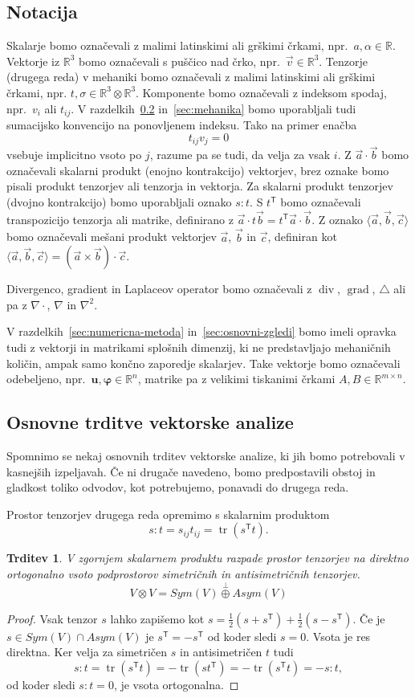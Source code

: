 \documentclass[12pt,a4paper,twoside]{article}
\theoremstyle{definition} %
\theoremstyle{plain} %
\newtheorem{trditev}[definicija]{Trditev}
\numberwithin{equation}{section}
\newcommand{\R}{\mathbb R}
\newcommand{\T}{\mathsf{T}}
\newcommand{\lap}{\triangle}
\renewcommand{\div}{\operatorname{div}}
\newcommand{\grad}{\operatorname{grad}}
\renewcommand{\b}{\boldsymbol}
\renewcommand{\phi}{\varphi}
\newcommand{\vv}{\vec{v}}
\newcommand{\va}{\vec{a}}
\newcommand{\vc}{\vec{c}}
\newcommand{\vb}{\vec{b}}
\DeclareMathOperator{\tr}{tr}
\begin{document}
\subsection{Notacija}
Skalarje bomo označevali z malimi latinskimi ali grškimi črkami, npr.\ $a, \alpha
\in \R$. Vektorje iz $\R^3$ bomo označevali s puščico nad črko, npr.\ $\vv \in
\R^3$. Tenzorje (drugega reda) v mehaniki bomo označevali z malimi latinskimi ali grškimi
črkami, npr. $t, \sigma \in \R^3\otimes\R^3$.
Komponente bomo označevali z indeksom spodaj, npr.\ $v_i$ ali $t_{ij}$.
V razdelkih~\ref{sec:uvod-tenz} in~\ref{sec:mehanika} bomo
uporabljali tudi sumacijsko konvencijo na ponovljenem indeksu. Tako na primer enačba
\[
  t_{ij}v_j = 0
\]
vsebuje implicitno vsoto po $j$, razume pa se tudi, da velja za vsak $i$.
Z $\va\cdot\vb$ bomo označevali skalarni produkt (enojno kontrakcijo) vektorjev, brez oznake bomo
pisali produkt tenzorjev ali tenzorja in vektorja. Za skalarni produkt tenzorjev (dvojno
kontrakcijo) bomo uporabljali oznako $s:t$.  S $t^\T$ bomo označevali transpozicijo tenzorja ali
matrike, definirano z $\va\cdot t\vb = t^\T\va \cdot \vb$. Z oznako $\langle \va, \vb, \vc\rangle$
bomo označevali mešani produkt vektorjev $\va$, $\vb$ in $\vc$, definiran kot $\langle \va, \vb,
\vc\rangle = (\va\times\vb)\cdot \vc$.

Divergenco, gradient in Laplaceov operator bomo označevali z $\div$, $\grad$,
$\lap$ ali pa z $\nabla\cdot$, $\nabla$ in $\nabla^2$.

V razdelkih~\ref{sec:numericna-metoda} in~\ref{sec:osnovni-zgledi} bomo imeli
opravka tudi z vektorji in matrikami splošnih dimenzij, ki ne predstavljajo
mehaničnih količin, ampak samo končno zaporedje skalarjev. Take vektorje bomo
označevali odebeljeno, npr.\ $\b u, \b\phi \in \R^{n}$, matrike pa z velikimi
tiskanimi črkami $A, B \in \R^{m\times n}$.

\subsection{Osnovne trditve vektorske analize}
\label{sec:uvod-tenz}
Spomnimo se nekaj osnovnih trditev vektorske analize, ki jih bomo
potrebovali v kasnejših izpeljavah. Če ni drugače navedeno, bomo predpostavili obstoj
in gladkost toliko odvodov, kot potrebujemo, ponavadi do drugega reda.

Prostor tenzorjev drugega reda opremimo s skalarnim produktom
\[ s:t = s_{ij}t_{ij} = \tr(s^\T t).\]
\begin{trditev}
  \label{trd:dot-antisym-tensor}
  V zgornjem skalarnem produktu razpade prostor tenzorjev na direktno
  ortogonalno vsoto podprostorov simetričnih in antisimetričnih tenzorjev.
  \[V\otimes V = Sym(V) \overset{\perp}{\oplus} Asym(V) \]
\end{trditev}
\begin{proof}
  Vsak tenzor $s$ lahko zapišemo kot $s = \frac12 (s+s^\T) + \frac12(s-s^\T)$.
  Če je $s \in Sym(V)\cap Asym(V)$ je $s^\T = -s^\T$ od koder sledi $s = 0$.
  Vsota je res direktna. Ker velja za simetričen $s$ in antisimetričen $t$ tudi
  \[ s:t = \tr(s^\T t) =  -\tr(s t^\T) = -\tr(s^\T t) = -s:t,\]
  od koder sledi $s:t = 0$, je vsota ortogonalna.
\end{proof}
\end{document}
